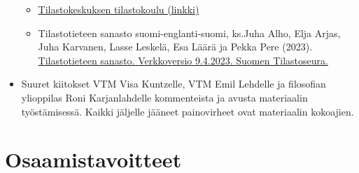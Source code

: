 \documentclass[
]{book}
\providecommand{\tightlist}{%
  \setlength{\itemsep}{0pt}\setlength{\parskip}{0pt}}
\begin{document}
\begin{itemize}
  \begin{itemize}
  \tightlist
  \item
    \href{https://tilastokoulu.stat.fi/verkkokoulu_v2.xql?course_id=tkoulu_tilaj\&lesson_id=1\&subject_id=0\&page_type=sisalto}{Tilastokeskuksen tilastokoulu (linkki)}
  \item
    Tilastotieteen sanasto suomi-englanti-suomi, ks.Juha Alho, Elja Arjas, Juha Karvanen, Lasse Leskelä, Esa Läärä ja Pekka Pere (2023). \href{https://sanasto.tilastoseura.fi/.}{Tilastotieteen sanasto. Verkkoversio 9.4.2023. Suomen Tilastoseura.}
  \end{itemize}
\item
  Suuret kiitokset VTM Visa Kuntzelle, VTM Emil Lehdelle ja filosofian ylioppilas Roni Karjanlahdelle kommenteista ja avusta materiaalin työstämisessä. Kaikki jäljelle jääneet painovirheet ovat materiaalin kokoajien.
\end{itemize}

\hypertarget{osaamistavoitteet}{%
\chapter*{Osaamistavoitteet}\label{osaamistavoitteet}}
\end{document}
